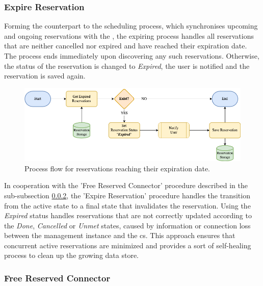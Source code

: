 \subsubsection{Expire Reservation}
\label{ch:Design:sec:Reservation System:ssec:Scheduling Capabilities:sssec:Expire Reservation}

Forming the counterpart to the scheduling process, which synchronises upcoming and ongoing reservations with the , the expiring process handles all reservations that are neither cancelled nor expired and have reached their expiration date.
The process ends immediately upon discovering any such reservations. Otherwise, the status of the reservation is changed to \textit{Expired}, the user is notified and the reservation is saved again.

\begin{figure}[h]
    \centering
    \includegraphics[scale=0.4]{resources/images/main/5_design/processes/scheduler/UpdateExpiredReservations.png}
    \caption{Process flow for reservations reaching their expiration date.}
    \label{fig:expire-reservation-flowchart}
\end{figure}

\noindent In cooperation with the 'Free Reserved Connector' procedure described in the sub-subsection \ref{ch:Design:sec:Reservation System:ssec:Scheduling Capabilities:sssec:Free Reserved Connector}, the 'Expire Reservation' procedure handles the transition from the active state to a final state that invalidates the reservation.
Using the \textit{Expired} status handles reservations that are not correctly updated according to the \textit{Done}, \textit{Cancelled} or \textit{Unmet} states, caused by information or connection loss between the management instance and the \acrshort{cs}.
This approach ensures that concurrent active reservations are minimized and provides a sort of self-healing process to clean up the growing data store.

\subsubsection{Free Reserved Connector}
\label{ch:Design:sec:Reservation System:ssec:Scheduling Capabilities:sssec:Free Reserved Connector}

